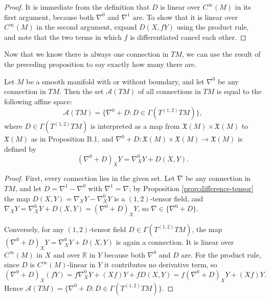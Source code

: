 \begin{proof}
\leanok
It is immediate from the definition that $D$ is linear over $C^\infty(M)$ in its first argument, because both $\nabla^0$ and $\nabla^1$ are. To show that it is linear over $C^\infty(M)$ in the second argument, expand $D(X, fY)$ using the product rule, and note that the two terms in which $f$ is differentiated cancel each other.
\end{proof}

Now that we know there is always one connection in $TM$, we can use the result of the preceding proposition to say exactly how many there are.

\begin{theorem}
\label{thm:connections-affine-space}
\leanok
Let $M$ be a smooth manifold with or without boundary, and let $\nabla^0$ be any connection in $TM$. Then the set $\mathcal{A}(TM)$ of all connections in $TM$ is equal to the following affine space:
\[
\mathcal{A}(TM) = \{\nabla^0 + D : D \in \Gamma(T^{(1,2)}TM)\},
\]
where $D \in \Gamma(T^{(1,2)}TM)$ is interpreted as a map from $\mathfrak{X}(M) \times \mathfrak{X}(M)$ to $\mathfrak{X}(M)$ as in Proposition B.1, and $\nabla^0 + D : \mathfrak{X}(M) \times \mathfrak{X}(M) \to \mathfrak{X}(M)$ is defined by
\[
(\nabla^0 + D)_X Y = \nabla^0_X Y + D(X,Y).
\]
\end{theorem}

\begin{proof}
\leanok
{}
First, every connection lies in the given set. Let $\nabla$ be any connection in $TM$, and let $D = \nabla^1 - \nabla^0$ with $\nabla^1 = \nabla$; by Proposition \ref{prop:difference-tensor} the map $D(X,Y) = \nabla_X Y - \nabla^0_X Y$ is a $(1,2)$-tensor field, and $\nabla_X Y = \nabla^0_X Y + D(X,Y) = (\nabla^0 + D)_X Y$, so $\nabla \in \{\nabla^0 + D\}$.

Conversely, for any $(1,2)$-tensor field $D \in \Gamma(T^{(1,2)}TM)$, the map $(\nabla^0 + D)_X Y = \nabla^0_X Y + D(X,Y)$ is again a connection. It is linear over $C^\infty(M)$ in $X$ and over $\mathbb{R}$ in $Y$ because both $\nabla^0$ and $D$ are. For the product rule, since $D$ is $C^\infty(M)$-linear in $Y$ it contributes no derivative term, so
\[
(\nabla^0 + D)_X(fY) = f\nabla^0_X Y + (Xf)Y + fD(X,Y) = f(\nabla^0 + D)_X Y + (Xf)Y.
\]
Hence $\mathcal{A}(TM) = \{\nabla^0 + D : D \in \Gamma(T^{(1,2)}TM)\}$.
\end{proof}

